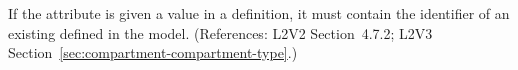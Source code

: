 If the  attribute is given a
value in a \Compartment definition, it must contain the identifier
of an existing \CompartmentType defined in the model.
(References: L2V2 Section~4.7.2; L2V3
Section~\ref{sec:compartment-compartment-type}.)
